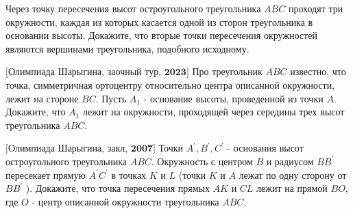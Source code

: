 \newpage

\centerline{\bf \Huge }
\centerline{\bf \Huge }


 Через точку пересечения высот остроугольного треугольника $A B C$ проходят три окружности, каждая из которых касается одной из сторон треугольника в основании высоты. Докажите, что вторые точки пересечения окружностей являются вершинами треугольника, подобного исходному.

$\bigl[\textbf{Олимпиада Шарыгина, заочный тур, 2023}\bigr]$
Про треугольник $A B C$ известно, что точка, симметричная ортоцентру относительно центра описанной окружности, лежит на стороне $B C$. Пусть $A_1$ - основание высоты, проведенной из точки $A$. Докажите, что $A_1$ лежит на окружности, проходящей через середины трех высот треугольника $A B C$.

$\bigl[\textbf{Олимпиада Шарыгина, закл, 2007}\bigr]$
Точки $A^{\prime}, B^{\prime}, C^{\prime}$ - основания высот остроугольного треугольника $A B C$. Окружность с центром $B$ и радиусом $B B^{\prime}$ пересекает прямую $A^{\prime} C^{\prime}$ в точках $K$ и $L$ (точки $K$ и $A$ лежат по одну сторону от $B B^{\prime}$ ). Докажите, что точка пересечения прямых $A K$ и $C L$ лежит на прямой $B O$, где $O$ - центр описанной окружности треугольника $A B C$.